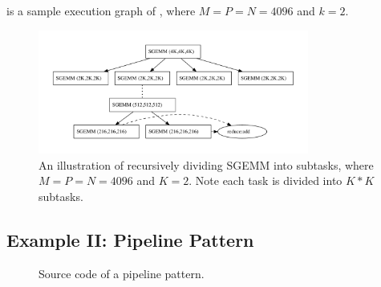 
 is a sample execution graph of ,
where $M=P=N=4096$ and $k=2$.







\begin{figure}[htb]
\includegraphics[width=3.5in]{../mmexample}
\caption{An illustration of recursively dividing SGEMM into subtasks, where
$M=P=N=4096$ and $K=2$. Note each task is divided into $K*K$ subtasks.
}
\label{fig:mmexample}
\end{figure}


\subsection{Example II: Pipeline Pattern}

\begin{figure}[hbt]
  \caption{Source code of a pipeline pattern.}
  \label{fig:pipe:code}
\end{figure}


